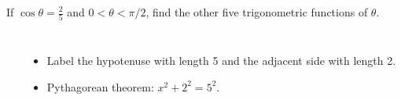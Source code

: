 \begin{frame}
\begin{example}
If $\cos \theta = \frac{2}{5}$ and $0 < \theta < \pi /2$, find the other five trigonometric functions of $\theta$.
\begin{columns}[c]
\ %
%
%
\begin{itemize}
\item<2->  Label the hypotenuse with length 5 and the adjacent side with length 2.
\item<3->  Pythagorean theorem: $x^2 +2^2 = 5^2$.

\end{itemize}
\end{columns}
\end{example}
\end{frame}
